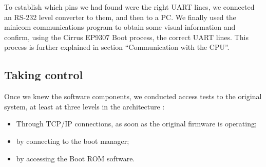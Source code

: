 \documentclass[conference]{IEEEtran}
\newcommand{\nota}[1]{}
\begin{document}
\nota {Para corroborar que los contactos del UART son los correctos, se conectó
el conversor de nivel RS-232 a los mismos, y luego a una PC.
Finalmente, se utilizó el programa de comunicaciones minicom para
obtener, al menos, información visual sin sentido, ya que
no se conocía a que velocidad de transmisión se encuentra operando
el firmware original.
}

To establish which pins we had found were the right UART lines, we
connected an RS-232 level converter to them, and then to a PC.
We finally used the minicom communications program to obtain some
visual information and confirm, using the Cirrus EP9307 Boot process, the correct UART lines. 
This process is further explained in section ``Communication with the CPU''.



\subsection{Taking control}
\nota {
Conociendo los componentes de software, se realizaron pruebas
de acceso al sistema original en al menos tres niveles de la arquitectura:
\begin{itemize}
\item A través de conexiones TCP/IP una vez que el firmware original está en ejecución,
\item a través del conexiones al gestor de arranque,
\item a través de accesos al software del Boot ROM.
\end{itemize}
}

Once we knew the software components, we conducted access tests to the original system, at least at three levels in the architecture :
\begin{itemize}
\item Through TCP/IP connections, as soon as the original firmware is operating;
\item by connecting to the boot manager;
\item by accessing the Boot ROM software.
\end{itemize}

\nota { En los primeros dos casos no se tuvieron resultados promisorios.
La tarea en estos puntos es obtener acceso como administrador del sistema
Linux cerrado. O en el caso del gestor de arranque, se busca
el acceso al interprete de comandos mínimo, que algunos gestores proveen.
Por lo que se continuó a mas bajo nivel, para obtener acceso a niveles
anteriores a la ejecución del gestor de arranque.}
\end{document}
